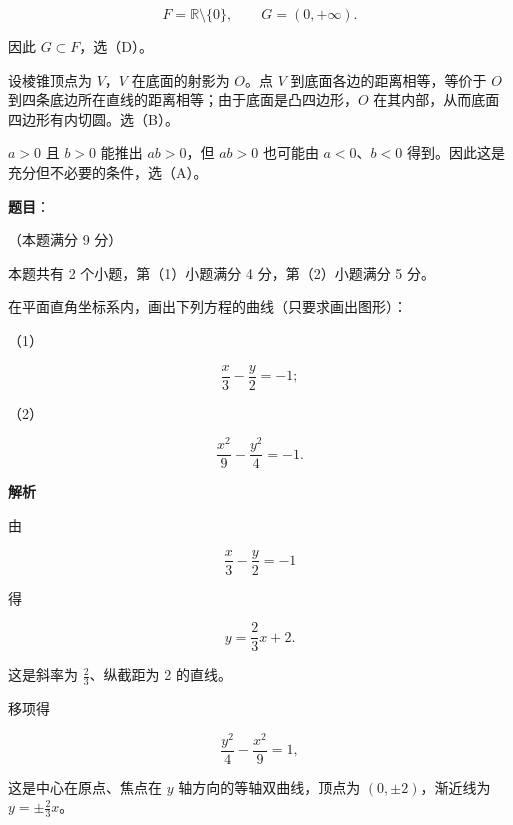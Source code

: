 \begin{answer}

\nopagebreak[4]
\[
F=\mathbb R\setminus\{0\},\qquad G=(0,+\infty).
\]

因此 $G\subset F$，选（D）。


设棱锥顶点为 $V$，$V$ 在底面的射影为 $O$。点 $V$ 到底面各边的距离相等，等价于 $O$ 到四条底边所在直线的距离相等；由于底面是凸四边形，$O$ 在其内部，从而底面四边形有内切圆。选（B）。


$a>0$ 且 $b>0$ 能推出 $ab>0$，但 $ab>0$ 也可能由 $a<0\text{、}b<0$ 得到。因此这是充分但不必要的条件，选（A）。






\end{answer}
\begin{answer}

\textbf{题目}：

（本题满分 9 分）

本题共有 2 个小题，第（1）小题满分 4 分，第（2）小题满分 5 分。

在平面直角坐标系内，画出下列方程的曲线（只要求画出图形）：

（1）　

\nopagebreak[4]
\[
\frac{x}{3}-\frac{y}{2}=-1;
\]

（2）　

\nopagebreak[4]
\[
\frac{x^2}{9}-\frac{y^2}{4}=-1.
\]
\nopagebreak[4]
\begin{center}\end{center}
\nopagebreak[4]
\textbf{解析}


由

\nopagebreak[4]
\[
\frac{x}{3}-\frac{y}{2}=-1
\]

得

\nopagebreak[4]
\[
y=\frac23x+2.
\]

这是斜率为 $\frac23$、纵截距为 2 的直线。


移项得

\nopagebreak[4]
\[
\frac{y^2}{4}-\frac{x^2}{9}=1,
\]

这是中心在原点、焦点在 $y$ 轴方向的等轴双曲线，顶点为
$(0,\pm2)$，渐近线为 $y=\pm\frac23x$。



\end{answer}
